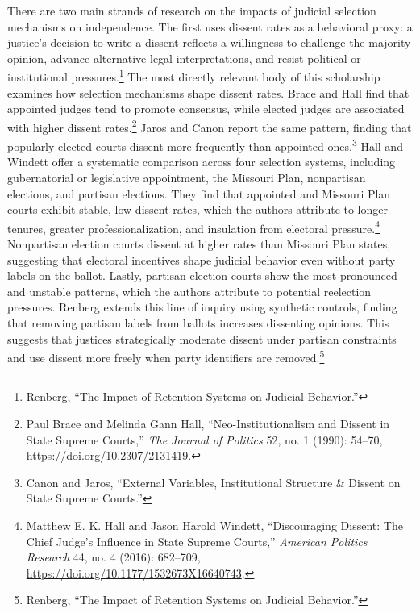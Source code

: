 There are two main strands of research on the impacts of judicial
selection mechanisms on independence. The first uses dissent rates as a
behavioral proxy: a justice's decision to write a dissent reflects a
willingness to challenge the majority opinion, advance alternative legal
interpretations, and resist political or institutional
pressures.\footnote{Renberg, {``The {Impact} of {Retention Systems} on
  {Judicial Behavior}.''}} The most directly relevant body of this
scholarship examines how selection mechanisms shape dissent rates. Brace
and Hall find that appointed judges tend to promote consensus, while
elected judges are associated with higher dissent rates.\footnote{Paul
  Brace and Melinda Gann Hall, {``Neo-{Institutionalism} and {Dissent}
  in {State Supreme Courts},''} \emph{The Journal of Politics} 52, no. 1
  (1990): 54--70, \url{https://doi.org/10.2307/2131419}.} Jaros and
Canon report the same pattern, finding that popularly elected courts
dissent more frequently than appointed ones.\footnote{Canon and Jaros,
  {``External {Variables}, {Institutional Structure} \& {Dissent} on
  {State Supreme Courts}.''}} Hall and Windett offer a systematic
comparison across four selection systems, including gubernatorial or
legislative appointment, the Missouri Plan, nonpartisan elections, and
partisan elections. They find that appointed and Missouri Plan courts
exhibit stable, low dissent rates, which the authors attribute to longer
tenures, greater professionalization, and insulation from electoral
pressure.\footnote{Matthew E. K. Hall and Jason Harold Windett,
  {``Discouraging {Dissent}: {The Chief Judge}'s {Influence} in {State
  Supreme Courts},''} \emph{American Politics Research} 44, no. 4
  (2016): 682--709, \url{https://doi.org/10.1177/1532673X16640743}.}
Nonpartisan election courts dissent at higher rates than Missouri Plan
states, suggesting that electoral incentives shape judicial behavior
even without party labels on the ballot. Lastly, partisan election
courts show the most pronounced and unstable patterns, which the authors
attribute to potential reelection pressures. Renberg extends this line
of inquiry using synthetic controls, finding that removing partisan
labels from ballots increases dissenting opinions. This suggests that
justices strategically moderate dissent under partisan constraints and
use dissent more freely when party identifiers are removed.\footnote{Renberg,
  {``The {Impact} of {Retention Systems} on {Judicial Behavior}.''}}

